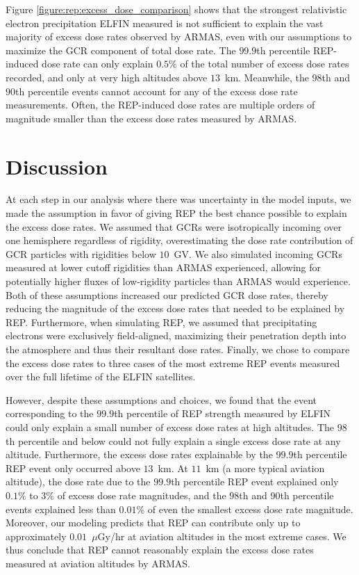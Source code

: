 \documentclass[draft]{agujournal2019}
\newcommand{\ugy}{$\mu$Gy}
\begin{document}
Figure \ref{figure:rep:excess_dose_comparison} shows that the strongest relativistic electron precipitation ELFIN measured is not sufficient to explain the vast majority of excess dose rates observed by ARMAS, even with our assumptions to maximize the GCR component of total dose rate. The $99.9$th percentile REP-induced dose rate can only explain $0.5\%$ of the total number of excess dose rates recorded, and only at very high altitudes above $13$~km. Meanwhile, the $98$th and $90$th percentile events cannot account for any of the excess dose rate measurements. Often, the REP-induced dose rates are multiple orders of magnitude smaller than the excess dose rates measured by ARMAS.

\section{Discussion}
At each step in our analysis where there was uncertainty in the model inputs, we made the assumption in favor of giving REP the best chance possible to explain the excess dose rates. We assumed that GCRs were isotropically incoming over one hemisphere regardless of rigidity, overestimating the dose rate contribution of GCR particles with rigidities below $10$~GV. We also simulated incoming GCRs measured at lower cutoff rigidities than ARMAS experienced, allowing for potentially higher fluxes of low-rigidity particles than ARMAS would experience. Both of these assumptions increased our predicted GCR dose rates, thereby reducing the magnitude of the excess dose rates that needed to be explained by REP. Furthermore, when simulating REP, we assumed that precipitating electrons were exclusively field-aligned, maximizing their penetration depth into the atmosphere and thus their resultant dose rates. Finally, we chose to compare the excess dose rates to three cases of the most extreme REP events measured over the full lifetime of the ELFIN satellites.

However, despite these assumptions and choices, we found that the event corresponding to the $99.9$th percentile of REP strength measured by ELFIN could only explain a small number of excess dose rates at high altitudes. The $98$th percentile and below could not fully explain a single excess dose rate at any altitude. Furthermore, the excess dose rates explainable by the $99.9$th percentile REP event only occurred above $13$~km. At $11$~km (a more typical aviation altitude), the dose rate due to the $99.9$th percentile REP event explained only $0.1\%$ to $3\%$ of excess dose rate magnitudes, and the $98$th and $90$th percentile events explained less than $0.01\%$ of even the smallest excess dose rate magnitude. Moreover, our modeling predicts that REP can contribute only up to approximately $0.01$~{\ugy}/hr at aviation altitudes in the most extreme cases. We thus conclude that REP cannot reasonably explain the excess dose rates measured at aviation altitudes by ARMAS.
\end{document}

